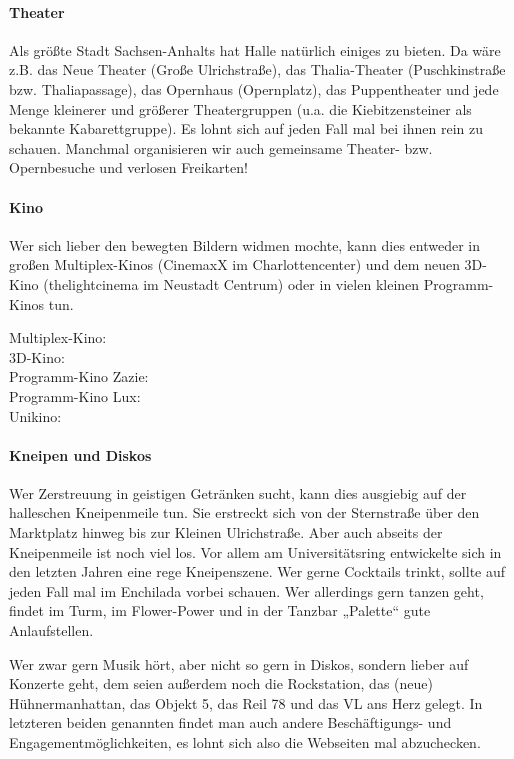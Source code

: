 \paragraph{Theater}
Als größte Stadt Sachsen-Anhalts hat Halle natürlich einiges zu bieten.
Da wäre z.B. das Neue Theater (Große Ulrichstraße), das Thalia-Theater (Puschkinstraße bzw. Thaliapassage), das Opernhaus (Opernplatz), das Puppentheater und jede Menge kleinerer und größerer Theatergruppen (\;u.a. die Kiebitzensteiner als bekannte Kabarettgruppe).
Es lohnt sich auf jeden Fall mal bei ihnen rein zu schauen.
Manchmal organisieren wir auch gemeinsame Theater- bzw. Opernbesuche und verlosen Freikarten!

\paragraph{Kino}
Wer sich lieber den bewegten Bildern widmen mochte, kann dies entweder in großen Multiplex-Kinos (CinemaxX im Charlottencenter) und dem neuen 3D-Kino (thelightcinema im Neustadt Centrum) oder in vielen kleinen Programm-Kinos tun.

Multiplex-Kino: \\
3D-Kino: \\
Programm-Kino Zazie: \\
Programm-Kino Lux: \\
Unikino: 


\paragraph{Kneipen und Diskos}
Wer Zerstreuung in geistigen Getränken sucht, kann dies ausgiebig auf der halleschen Kneipenmeile tun.
Sie erstreckt sich von der Sternstraße über den Marktplatz hinweg bis zur Kleinen Ulrichstraße.
Aber auch abseits der Kneipenmeile ist noch viel los.
Vor allem am Universitätsring entwickelte sich in den letzten Jahren eine rege Kneipenszene.
Wer gerne Cocktails trinkt, sollte auf jeden Fall mal im Enchilada vorbei schauen.
Wer allerdings gern tanzen geht, findet im Turm, im Flower-Power und in der Tanzbar „Palette“ gute Anlaufstellen.

Wer zwar gern Musik hört, aber nicht so gern in Diskos, sondern lieber auf Konzerte geht, dem seien außerdem noch die Rockstation, das (neue) Hühnermanhattan, das Objekt 5, das Reil 78 und das VL ans Herz gelegt.
In letzteren beiden genannten findet man auch andere Beschäftigungs- und Engagementmöglichkeiten, es lohnt sich also die Webseiten mal abzuchecken.

